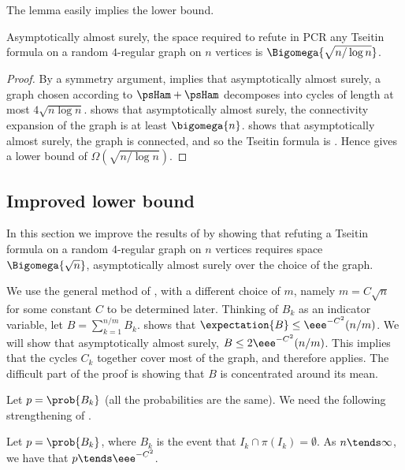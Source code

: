 The lemma easily implies the lower bound.

\begin{theorem} \label{thm:simple}
 Asymptotically almost surely, the space required to refute in PCR any Tseitin formula on a random $4$-regular graph on $n$ vertices is $\Bigomega{\sqrt{n/\log n}}$.
\end{theorem}
\begin{proof}
 By a symmetry argument,  implies that asymptotically almost surely, a graph chosen according to $\psHam + \psHam$ decomposes into cycles of %
 length at most $4\sqrt{n \log n}$.  shows that asymptotically almost surely, the connectivity expansion of the graph is at least $\bigomega{n}$.  shows that asymptotically almost surely, the graph is connected, and so the Tseitin formula is \Gnonsplittingnot. Hence  gives a lower bound of $\Omega(\sqrt{n/\log n})$.
\end{proof}

\subsection{Improved lower bound} \label{sec:improved}

In this section we improve the results of  by showing that refuting a \Gnonsplitting Tseitin formula on a random $4$-regular graph on $n$ vertices requires space $\Bigomega{\sqrt{n}}$, asymptotically almost surely over the choice of the graph.

We use the general method of , with a different choice of $m$, namely $m = C\sqrt{n}$ for some constant $C$ to be determined later. Thinking of $B_k$ as an indicator variable, let $B = \sum_{k=1}^{n/m} B_k$.  shows that $\expectation{B} \leq \eee^{-C^2} (n/m)$. We will show that asymptotically almost surely, $B \leq 2\eee^{-C^2} (n/m)$. This implies that the cycles $C_k$ together cover most of the graph, and therefore  applies. The difficult part of the proof is showing that $B$ is concentrated around its mean.

Let $p = \prob{B_k}$ (all the probabilities are the same). We need the following strengthening of .

\begin{lemma} \label{lem:b-prob-limit}
 Let $p = \prob{B_k}$, where $B_k$ is the event that $I_k \cap \pi(I_k) = \emptyset$. As $n \tends \infty$, we have that $p \tends \eee^{-C^2}$.
\end{lemma}

